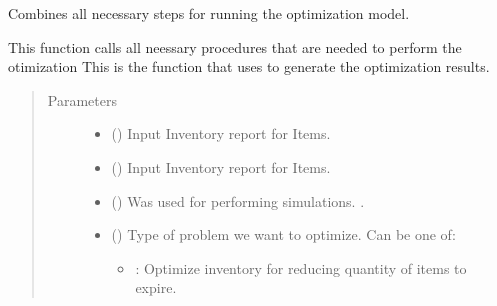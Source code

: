 \documentclass[letterpaper,10pt,english]{sphinxmanual}
\begin{document}
\begin{fulllineitems}
\label{\detokenize{source/optimization.model:optimization.model.main.main}}
Combines all necessary steps for running the optimization model.

This function calls all neessary procedures that are needed to perform the otimization
This is the function that  uses to generate the optimization results.
\begin{quote}\begin{description}
\item[{Parameters}] \leavevmode\begin{itemize}
\item {} 
 () \textendash{} Input Inventory report for  Items.

\item {} 
 () \textendash{} Input Inventory report for  Items.

\item {} 
 () \textendash{} Was used for performing simulations. .

\item {} 
 () \textendash{} 
Type of problem we want to optimize. Can be one of:
\begin{itemize}
\item {} 
: Optimize inventory for reducing  quantity of items to expire.


\end{itemize}
\end{itemize}
\end{description}
\end{quote}
\end{fulllineitems}
\end{document}
